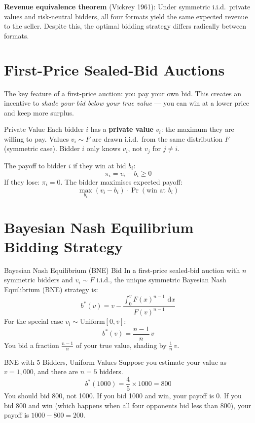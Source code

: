 \documentclass[12pt,a4paper,openany]{report}
\theoremstyle{definition}
\newcommand{\dd}{\,\mathrm{d}}
\begin{document}
\textbf{Revenue equivalence theorem} (Vickrey 1961): Under symmetric i.i.d.\ private values and risk-neutral bidders, all four formats yield the same expected revenue to the seller. Despite this, the optimal bidding strategy differs radically between formats.

\section{First-Price Sealed-Bid Auctions}

The key feature of a first-price auction: you pay your own bid. This creates an incentive to \emph{shade your bid below your true value} — you can win at a lower price and keep more surplus.

\begin{definitionbox}{Private Value}
Each bidder $i$ has a \textbf{private value} $v_i$: the maximum they are willing to pay. Values $v_i \sim F$ are drawn i.i.d.\ from the same distribution $F$ (symmetric case). Bidder $i$ only knows $v_i$, not $v_j$ for $j \ne i$.
\end{definitionbox}

The payoff to bidder $i$ if they win at bid $b_i$:
\[
  \pi_i = v_i - b_i \geq 0
\]
If they lose: $\pi_i = 0$. The bidder maximises expected payoff:
\[
  \max_{b_i} (v_i - b_i) \cdot \Pr(\text{win at } b_i)
\]

\section{Bayesian Nash Equilibrium Bidding Strategy}

\begin{definitionbox}{Bayesian Nash Equilibrium (BNE) Bid}
In a first-price sealed-bid auction with $n$ symmetric bidders and $v_i \sim F$ i.i.d., the unique symmetric Bayesian Nash Equilibrium (BNE) strategy is:
\[
  b^*(v) = v - \frac{\int_0^v F(x)^{n-1}\,\dd x}{F(v)^{n-1}}
\]
For the special case $v_i \sim \mathrm{Uniform}[0, \bar{v}]$:
\[
  b^*(v) = \frac{n-1}{n}\,v
\]
You bid a fraction $\frac{n-1}{n}$ of your true value, shading by $\frac{1}{n}\,v$.
\end{definitionbox}

\begin{examplebox}{BNE with 5 Bidders, Uniform Values}
Suppose you estimate your value as $v = 1{,}000$, and there are $n = 5$ bidders.
\[
  b^*(1000) = \frac{4}{5} \times 1000 = 800
\]
You should bid 800, not 1000. If you bid 1000 and win, your payoff is 0. If you bid 800 and win (which happens when all four opponents bid less than 800), your payoff is $1000 - 800 = 200$.
\end{examplebox}
\end{document}
